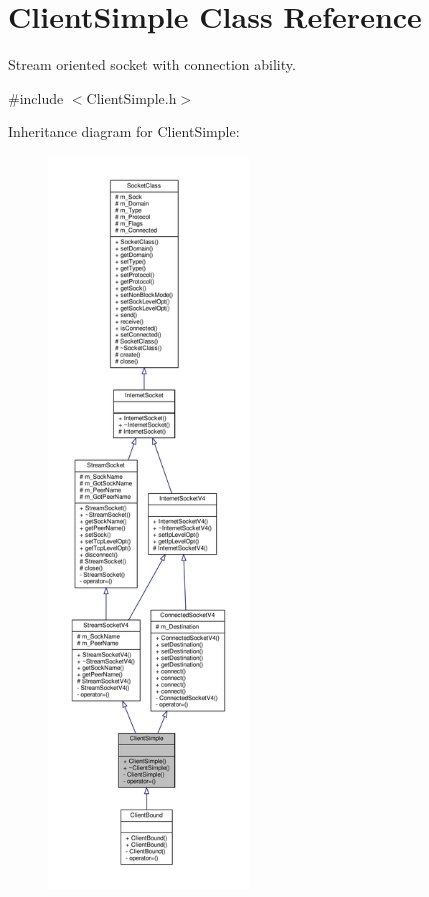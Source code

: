 \hypertarget{classClientSimple}{}\section{Client\+Simple Class Reference}
\label{classClientSimple}


Stream oriented socket with connection ability.  




{\ttfamily \#include $<$Client\+Simple.\+h$>$}



Inheritance diagram for Client\+Simple\+:\nopagebreak
\begin{figure}[H]
\begin{center}
\leavevmode
\includegraphics[height=550pt]{classClientSimple__inherit__graph}
\end{center}
\end{figure}
